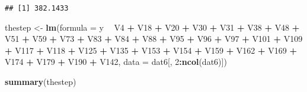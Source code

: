 \documentclass[
]{article}
\newenvironment{Shaded}{\begin{snugshade}}{\end{snugshade}}
\newcommand{\DataTypeTok}[1]{\textcolor[rgb]{0.13,0.29,0.53}{#1}}
\newcommand{\DecValTok}[1]{\textcolor[rgb]{0.00,0.00,0.81}{#1}}
\newcommand{\KeywordTok}[1]{\textcolor[rgb]{0.13,0.29,0.53}{\textbf{#1}}}
\newcommand{\NormalTok}[1]{#1}
\newcommand{\OperatorTok}[1]{\textcolor[rgb]{0.81,0.36,0.00}{\textbf{#1}}}
\newcommand{\StringTok}[1]{\textcolor[rgb]{0.31,0.60,0.02}{#1}}
\begin{document}
\begin{verbatim}
## [1] 382.1433
\end{verbatim}

\begin{Shaded}
\begin{Highlighting}[]
\NormalTok{thestep <-}\StringTok{ }\KeywordTok{lm}\NormalTok{(}\DataTypeTok{formula =}\NormalTok{ y }\OperatorTok{~}\StringTok{ }\NormalTok{V4 }\OperatorTok{+}\StringTok{ }\NormalTok{V18 }\OperatorTok{+}\StringTok{ }\NormalTok{V20 }\OperatorTok{+}\StringTok{ }\NormalTok{V30 }\OperatorTok{+}\StringTok{ }\NormalTok{V31 }\OperatorTok{+}\StringTok{ }\NormalTok{V38 }\OperatorTok{+}\StringTok{ }\NormalTok{V48 }\OperatorTok{+}\StringTok{ }\NormalTok{V51 }\OperatorTok{+}\StringTok{ }
\StringTok{    }\NormalTok{V59 }\OperatorTok{+}\StringTok{ }\NormalTok{V73 }\OperatorTok{+}\StringTok{ }\NormalTok{V83 }\OperatorTok{+}\StringTok{ }\NormalTok{V84 }\OperatorTok{+}\StringTok{ }\NormalTok{V88 }\OperatorTok{+}\StringTok{ }\NormalTok{V95 }\OperatorTok{+}\StringTok{ }\NormalTok{V96 }\OperatorTok{+}\StringTok{ }\NormalTok{V97 }\OperatorTok{+}\StringTok{ }\NormalTok{V101 }\OperatorTok{+}\StringTok{ }\NormalTok{V109 }\OperatorTok{+}\StringTok{ }
\StringTok{    }\NormalTok{V117 }\OperatorTok{+}\StringTok{ }\NormalTok{V118 }\OperatorTok{+}\StringTok{ }\NormalTok{V125 }\OperatorTok{+}\StringTok{ }\NormalTok{V135 }\OperatorTok{+}\StringTok{ }\NormalTok{V153 }\OperatorTok{+}\StringTok{ }\NormalTok{V154 }\OperatorTok{+}\StringTok{ }\NormalTok{V159 }\OperatorTok{+}\StringTok{ }\NormalTok{V162 }\OperatorTok{+}\StringTok{ }\NormalTok{V169 }\OperatorTok{+}\StringTok{ }
\StringTok{    }\NormalTok{V174 }\OperatorTok{+}\StringTok{ }\NormalTok{V179 }\OperatorTok{+}\StringTok{ }\NormalTok{V190 }\OperatorTok{+}\StringTok{ }\NormalTok{V142, }\DataTypeTok{data =}\NormalTok{ dat6[, }\DecValTok{2}\OperatorTok{:}\KeywordTok{ncol}\NormalTok{(dat6)])}

\KeywordTok{summary}\NormalTok{(thestep)}
\end{Highlighting}
\end{Shaded}
\end{document}
